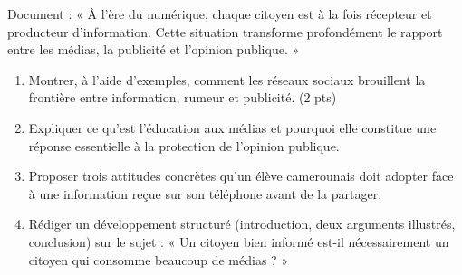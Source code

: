 \documentclass[11pt]{article}
\begin{document}
\begin{exercice}
Document : « À l'ère du numérique, chaque citoyen est à la fois récepteur et producteur d'information. Cette situation transforme profondément le rapport entre les médias, la publicité et l'opinion publique. »
\begin{enumerate}
\item Montrer, à l'aide d'exemples, comment les réseaux sociaux brouillent la frontière entre information, rumeur et publicité. (2 pts)
\item Expliquer ce qu'est l'éducation aux médias et pourquoi elle constitue une réponse essentielle à la protection de l'opinion publique.
\item Proposer trois attitudes concrètes qu'un élève camerounais doit adopter face à une information reçue sur son téléphone avant de la partager.
\item Rédiger un développement structuré (introduction, deux arguments illustrés, conclusion) sur le sujet : « Un citoyen bien informé est-il nécessairement un citoyen qui consomme beaucoup de médias ? »
\end{enumerate}
\end{exercice}
\end{document}
